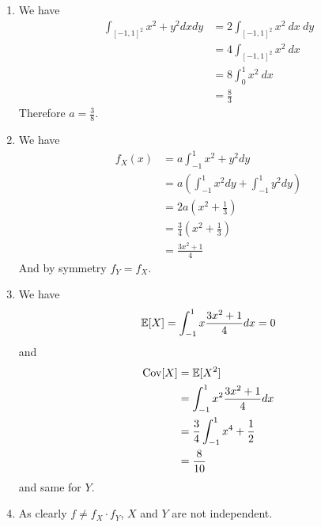 \begin{solution}
  \begin{enumerate}
    \item We have
          \begin{align*}
            \int_{{[-1, 1]}^2} x^2 + y^2 dx dy & = 2 \int_{{[-1, 1]}^2} x^2 ~ dx ~ dy \\
                                               & = 4 \int_{{[-1, 1]}^2} x^2 ~ dx      \\
                                               & = 8 \int_0^1 x^2 ~ dx                \\
                                               & = \frac{8}{3}
          \end{align*}
          Therefore $a = \frac{3}{8}$.
    \item We have
          \begin{align*}
            f_X(x) & = a \int_{-1}^1 x^2 + y^2 dy                               \\
                   & = a \left( \int_{-1}^1 x^2 dy + \int_{-1}^1 y^2 dy \right) \\
                   & = 2 a (x^2 + \frac{1}{3})                                  \\
                   & = \frac{3}{4} (x^2 + \frac{1}{3})                          \\
                   & = \frac{3x^2 + 1}{4}
          \end{align*}
          And by symmetry $f_Y = f_X$.
    \item We have $$\mathbb{E}[X] = \int_{-1}^1 x \frac{3x^2 + 1}{4} dx = 0 $$ and
          \begin{align*}
            \operatorname{Cov}[X] & = \mathbb{E}[X^2]                           \\
                    & = \int_{-1}^1 x^2  \frac{3x^2 + 1}{4} dx    \\
                    & = \frac{3}{4} \int_{-1}^1 x^4 + \frac{1}{2} \\
                    & = \frac{8}{10}
          \end{align*}
          and same for $Y$.
    \item As clearly $f \neq f_X \cdot f_Y$, $X$ and $Y$ are not independent.
  \end{enumerate}
\end{solution}


